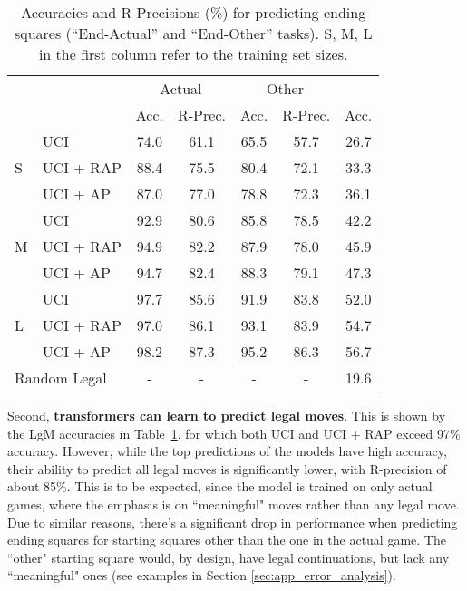 \documentclass[12pt]{thesis-umich}[thesis]
\newcommand{\legalmove}{LgM\xspace}
\newcommand{\piecetype}{AP\xspace}
\begin{document}
\begin{table}
{\begin{tabular}{llccccc}
			&  &  \multicolumn{2}{c}{Actual} &   \multicolumn{2}{c}{Other} &  \\
			&  &  Acc. & R-Prec. & Acc. & R-Prec. & Acc.\\
			\midrule
			\multirow{3}{*}{S}
			& UCI  				&  74.0 & 61.1 & 65.5 & 57.7  & 26.7 \\
			& UCI + RAP  		&  88.4 & 75.5 & 80.4 & 72.1  & 33.3  \\
			& UCI + \piecetype 	&  87.0 & 77.0 & 78.8 & 72.3  & 36.1   \\
			\midrule
			\multirow{3}{*}{M}
			& UCI  				&  92.9 & 80.6 & 85.8 & 78.5  & 42.2  \\
			& UCI + RAP  		&  94.9 & 82.2 & 87.9 & 78.0  & 45.9  \\
			& UCI + \piecetype 	&  94.7 & 82.4 & 88.3 & 79.1  & 47.3   \\ 
			\midrule
			\multirow{3}{*}{L}
			& UCI  				&  97.7 & 85.6 & 91.9 & 83.8  & 52.0   \\
			& UCI + RAP  		&  97.0 & 86.1 & 93.1 & 83.9  & 54.7  \\
			& UCI + \piecetype 	&  98.2 & 87.3 & 95.2 & 86.3  & 56.7  \\
			\midrule
			\multicolumn{2}{l}{Random Legal} & - & - & - & - & 19.6 \\
			\bottomrule
			
		\end{tabular}
	\caption{Accuracies and R-Precisions (\%) for predicting ending squares (``End-Actual'' and ``End-Other'' tasks). S, M, L in the first column refer to the training set sizes.
	}
	\label{tab:results-ending}
	
	}
\end{table} 

Second, \textbf{transformers can learn to predict legal moves}.
This is shown by the \legalmove accuracies in  Table~\ref{tab:results-ending}, for which both UCI and UCI + RAP exceed 97\% accuracy. 
However, while the top predictions of the models have high accuracy, their ability to predict all legal moves is significantly lower, with R-precision of about 85\%. 
This is to be expected, since the model is trained on only actual games, where the emphasis is on ``meaningful" moves rather than any legal move. 
Due to similar reasons, there's a significant drop in performance when predicting ending squares for starting squares other than the one in the actual game. 
	The ``other" starting square would, by design, have legal continuations, but lack any ``meaningful" ones 	(see examples in Section \ref{sec:app_error_analysis}).
\end{document}
